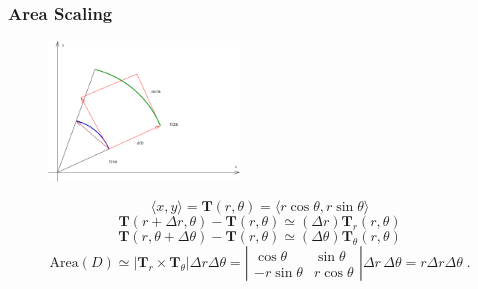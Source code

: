 \begin{frame}
\frametitle{Area Scaling}
\begin{figure}
        \includegraphics[width=2in]{../images/polar_element_area.eps}
    \end{figure}

$$\langle x, y \rangle = \textbf{T}(r,\theta) = \langle r\cos\theta, r\sin\theta\rangle$$
%
$$\textbf{T}(r+\Delta r,\theta)-\textbf{T}(r,\theta) \simeq (\Delta r) \textbf{T}_r(r,\theta)$$
%
$$\textbf{T}(r,\theta+\Delta \theta)-\textbf{T}(r,\theta) \simeq (\Delta \theta) \textbf{T}_\theta(r,\theta)$$
%
$$\text{Area}(D) \simeq |\textbf{T}_r \times \textbf{T}_\theta |\Delta r \Delta \theta =
\left|
\begin{array}{cc}
  \cos{\theta} & \sin{\theta} \\
  -r\sin{\theta} & r\cos{\theta}
\end{array}
\right| \Delta r\, \Delta \theta = r\Delta r \Delta \theta \; .$$

\end{frame}

